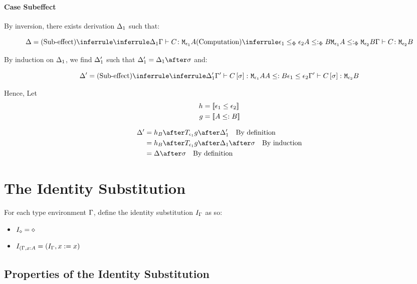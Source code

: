 {    \paragraph{Case Subeffect}

    By inversion, there exists derivation $\Delta_1$ such that:

    \begin{equation}
        \D = \ntreeruleII{Sub-effect}{\treeruleI{\D_1}{\typerelation{\G}{C}{\M{\e_1}{A}}}}{ \subeffecttree{\e_1}{A}{\e_2}{B}}{\typerelation{\G}{C}{\M{\e_2}{B}}}
    \end{equation}

    By induction on $\Delta_1$, we find $\Delta_1'$ such that $\D_1' = \D_1\after\si$ and:

    \begin{equation}
        \D' = \ntreeruleII{Sub-effect}{\treeruleI{\D_1'}{\typerelation{\G'}{C\ssi}{\M{\e_1}{A}}}}{ A\subtype B}{ \e_1\subeffect\e_2}{\typerelation{\G'}{C\ssi}{\M{\e_2}{B}}}
    \end{equation}

    Hence,
    Let
    \begin{align}
        h &= {\bf [\![}\epsilon_1\leq\epsilon_2{\bf ]\!]}\\
        g &= {\bf [\![}A\leq: B{\bf ]\!]}
    \end{align}

    \begin{align}
        \D' &= h_B\after\T{\e_1}{g}\after\D_1'\qt{By definition}\\
            &= h_B\after\T{\e_1}{g}\after\D_1\after\si\qt{By induction}\\
            &= \D\after\si\qt{By definition}\\
    \end{align}
    
    \section{The Identity Substitution}
    For each type environment $\Gamma$, define the identity substitution $I_{\Gamma}$ as so:

    \begin{itemize}
        \item $I_{\diamond} = \diamond$
        \item $I_{(\Gamma, x: A} = (I_{\Gamma}, x:= x)$
    \end{itemize}

    \subsection{Properties of the Identity Substitution}
}
